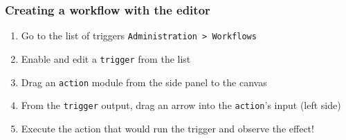 \begin{frame}
    \frametitle{Creating a workflow with the editor}
    \begin{enumerate}
        \item Go to the list of triggers \texttt{Administration > Workflows}
        \item Enable and edit a \texttt{trigger} from the list
        \item Drag an \texttt{action} module from the side panel to the canvas
        \item From the \texttt{trigger} output, drag an arrow into the \texttt{action}'s input (left side)
        \item Execute the action that would run the trigger and observe the effect!
    \end{enumerate}
    \begin{center}
    \end{center}
    \begin{center}
    \end{center}
\end{frame}


